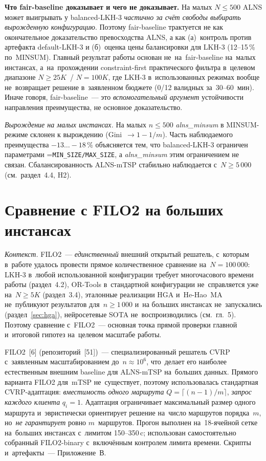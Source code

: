 \documentclass[a4paper,14pt]{extreport}
\makeatletter
\let\old@texttt\texttt
\renewcommand{\texttt}[1]{{\sloppy\hyphenchar\font=\m@ne\old@texttt{#1}}}
\makeatother
\begin{document}
\medskip
\textbf{Что fair-baseline доказывает и чего не доказывает.} На малых $N\leq 500$ ALNS может выигрывать у balanced-LKH-3 \emph{частично за счёт свободы выбирать вырожденную конфигурацию}. Поэтому fair-baseline трактуется не как окончательное доказательство превосходства ALNS, а как (а)~контроль против артефакта default-LKH-3 и (б)~оценка цены балансировки для LKH-3 (12--15\,\% по~MINSUM). Главный результат работы основан не~на~fair-baseline на~малых инстансах, а~на~прохождении constraint-first практического фильтра в~целевом диапазоне $N\geq 25K$~/ $N=100K$, где LKH-3 в~использованных режимах вообще не~возвращает решение в~заявленном бюджете (0/12 валидных за~30--60~мин). Иначе говоря, fair-baseline~--- это \emph{вспомогательный аргумент} устойчивости направления преимущества, не основное доказательство.

\medskip
\textit{Вырождение на малых инстансах.} На малых $n\leq 500$ \emph{alns\_minsum} в MINSUM-режиме склонен к вырождению (Gini~$\to 1{-}1/m$). Часть наблюдаемого преимущества $-13\dots-18\,\%$ объясняется тем, что balanced-LKH-3 ограничен параметрами \texttt{MIN\_SIZE/MAX\_SIZE}, а \emph{alns\_minsum} этим ограничением не связан. Сбалансированность ALNS-mTSP стабильно наблюдается с~$N\geq 5\,000$ (см.~раздел~4.4, H2).

\section{Сравнение с FILO2 на больших инстансах}

\textit{Контекст.} FILO2~--- \emph{единственный} внешний открытый решатель, с~которым в~работе удалось провести прямое количественное сравнение на~$N=100\,000$: LKH-3 в~любой использованной конфигурации требует многочасового времени работы (раздел~4.2), OR-Tools в~стандартной конфигурации не~справляется уже на~$N\geq 5K$ (раздел~3.4), эталонные реализации HGA и~He-Hao~MA не~публикуют результатов для~$n\geq 1\,000$ и~на больших инстансах не~запускались (раздел~\ref{sec:hga}), нейросетевые SOTA не~воспроизводились (см.~гл.~5). Поэтому сравнение с~FILO2~--- основная точка прямой проверки главной и~итоговой гипотез на~целевом масштабе работы.

\medskip
FILO2~[6] (репозиторий~[51])~--- специализированный решатель CVRP с~заявленным масштабированием до~$n\approx 10^6$, что~делает его наиболее естественным внешним baseline для ALNS-mTSP на~больших данных. Прямого варианта FILO2 для~mTSP не~существует, поэтому использовалась стандартная CVRP-адаптация: \emph{вместимость одного маршрута} $Q=\lceil(n-1)/m\rceil$, \emph{запрос каждого клиента} $q_i=1$. Адаптация ограничивает максимальный размер одного маршрута и~эвристически ориентирует решение на~число маршрутов порядка~$m$, но~\emph{не гарантирует} ровно $m$~маршрутов. Прогон выполнен на~18-ячейной сетке на~больших инстансах с~лимитом 150--350\,c; использован самостоятельно собранный FILO2-binary с~включённым контролем лимита времени. Скрипты и~артефакты~--- Приложение~В.
\end{document}
